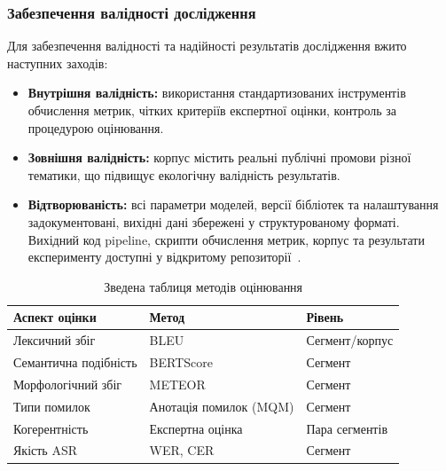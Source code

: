 \subsubsection{Забезпечення валідності дослідження}

Для забезпечення валідності та надійності результатів дослідження вжито
наступних заходів:

\begin{itemize}
    \item \textbf{Внутрішня валідність:} використання стандартизованих
    інструментів обчислення метрик, чітких критеріїв експертної оцінки,
    контроль за процедурою оцінювання.

    \item \textbf{Зовнішня валідність:} корпус містить реальні публічні
    промови різної тематики, що підвищує екологічну валідність результатів.

    \item \textbf{Відтворюваність:} всі параметри моделей, версії бібліотек
    та налаштування задокументовані, вихідні дані збережені у структурованому
    форматі. Вихідний код pipeline, скрипти обчислення метрик, корпус та
    результати експерименту доступні у відкритому репозиторії~\cite{repo}.
\end{itemize}

\begin{table}[H]
\centering
\caption{Зведена таблиця методів оцінювання}
\label{tab:evaluation_methods}
\begin{tabular}{|l|l|l|}
\hline
\textbf{Аспект оцінки} & \textbf{Метод} & \textbf{Рівень} \\
\hline
Лексичний збіг & BLEU & Сегмент/корпус \\
Семантична подібність & BERTScore & Сегмент \\
Морфологічний збіг & METEOR & Сегмент \\
Типи помилок & Анотація помилок (MQM) & Сегмент \\
Когерентність & Експертна оцінка & Пара сегментів \\
Якість ASR & WER, CER & Сегмент \\
\hline
\end{tabular}
\end{table}
